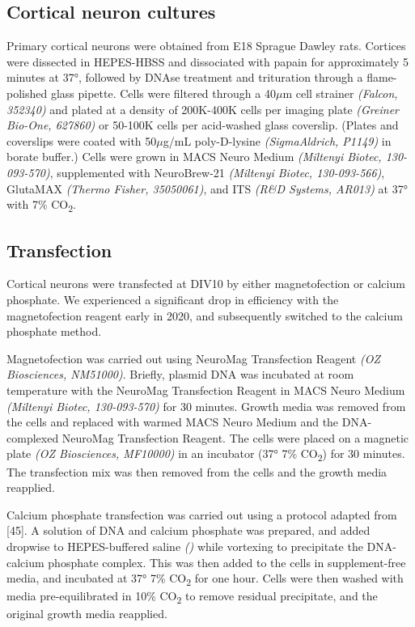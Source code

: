\documentclass[
  12pt,
  a4paper,
]{book}
\begin{document}
\hypertarget{cortical-neuron-cultures}{%
\subsection{Cortical neuron cultures}\label{cortical-neuron-cultures}}

Primary cortical neurons were obtained from E18 Sprague Dawley rats. Cortices were dissected in HEPES-HBSS and dissociated with papain for approximately 5 minutes at 37°, followed by DNAse treatment and trituration through a flame-polished glass pipette. Cells were filtered through a 40\(\mu\)m cell strainer \emph{(Falcon, 352340)} and plated at a density of 200K-400K cells per imaging plate \emph{(Greiner Bio-One, 627860)} or 50-100K cells per acid-washed glass coverslip. (Plates and coverslips were coated with 50\(\mu\)g/mL poly-D-lysine \emph{(SigmaAldrich, P1149)} in borate buffer.) Cells were grown in MACS Neuro Medium \emph{(Miltenyi Biotec, 130-093-570)}, supplemented with NeuroBrew-21 \emph{(Miltenyi Biotec, 130-093-566)}, GlutaMAX \emph{(Thermo Fisher, 35050061)}, and ITS \emph{(R\&D Systems, AR013)} at 37° with 7\% CO\textsubscript{2}.

\hypertarget{transfection}{%
\subsection{Transfection}\label{transfection}}

Cortical neurons were transfected at DIV10 by either magnetofection or calcium phosphate. We experienced a significant drop in efficiency with the magnetofection reagent early in 2020, and subsequently switched to the calcium phosphate method.

Magnetofection was carried out using NeuroMag Transfection Reagent \emph{(OZ Biosciences, NM51000)}. Briefly, plasmid DNA was incubated at room temperature with the NeuroMag Transfection Reagent in MACS Neuro Medium \emph{(Miltenyi Biotec, 130-093-570)} for 30 minutes. Growth media was removed from the cells and replaced with warmed MACS Neuro Medium and the DNA-complexed NeuroMag Transfection Reagent. The cells were placed on a magnetic plate \emph{(OZ Biosciences, MF10000)} in an incubator (37° 7\% CO\textsubscript{2}) for 30 minutes. The transfection mix was then removed from the cells and the growth media reapplied.

Calcium phosphate transfection was carried out using a protocol adapted from {[}45{]}. A solution of DNA and calcium phosphate was prepared, and added dropwise to HEPES-buffered saline \emph{()} while vortexing to precipitate the DNA-calcium phosphate complex. This was then added to the cells in supplement-free media, and incubated at 37° 7\% CO\textsubscript{2} for one hour. Cells were then washed with media pre-equilibrated in 10\% CO\textsubscript{2} to remove residual precipitate, and the original growth media reapplied.
\end{document}
